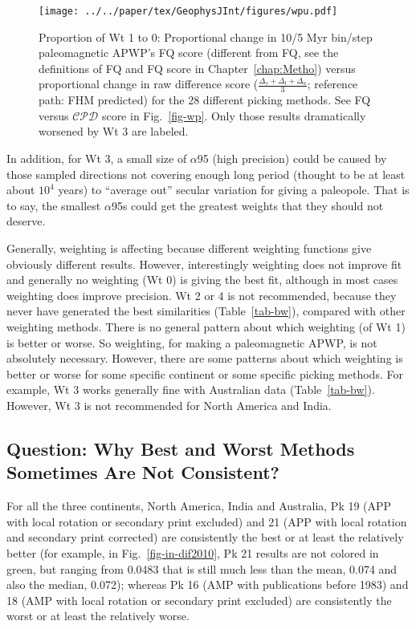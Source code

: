\begin{figure}
  \centering
  \texttt{[image: ../../paper/tex/GeophysJInt/figures/wpu.pdf]}
  \caption[Proportional changes of Wt 1 to 0: Paleomagnetic APWP's
    FQ score vs raw difference score]{Proportion of Wt 1 to 0:
    Proportional change in 10/5 Myr bin/step paleomagnetic APWP's FQ score
    (different from FQ, see the definitions of FQ and FQ score in
    Chapter~\ref{chap:Metho}) versus proportional change in raw difference score
    ($\frac{\Delta_s+\Delta_l+\Delta_a}{3}$; reference path: FHM predicted) for
    the 28 different picking methods. See FQ versus $\mathcal{CPD}$ score in
    Fig.~\ref{fig-wp}. Only those results dramatically worsened by Wt 3 are
    labeled.}\label{fig-wpu}
\end{figure}

In addition, for Wt 3, a small size of $\alpha$95 (high precision) could be
caused by those sampled directions not covering enough long period (thought to
be at least about $10^4$ years) to ``average out'' secular variation for giving
a paleopole. That is to say, the smallest $\alpha$95s could get the greatest
weights that they should not deserve.

Generally, weighting is affecting because different weighting functions give
obviously different results. However, interestingly weighting does not improve
fit and generally no weighting (Wt 0) is giving the best fit, although in most
cases weighting does improve precision. Wt 2 or 4 is not recommended, because
they never have generated the best similarities (Table~\ref{tab-bw}), compared
with other weighting methods. There is no general pattern about which weighting
(of Wt 1) is better or worse. So weighting, for making a
paleomagnetic APWP, is not absolutely necessary. However, there are some
patterns about which weighting is better or worse for some specific continent or
some specific picking methods. For example, Wt 3 works generally fine with
Australian data (Table~\ref{tab-bw}). However, Wt 3 is not recommended for North
America and India.

\subsection{Question: Why Best and Worst Methods Sometimes Are Not Consistent?}

For all the three continents, North America, India and Australia, Pk 19 (APP
with local rotation or secondary print excluded) and 21 (APP with local rotation
and secondary print corrected) are consistently the best or at least the
relatively better (for example, in Fig.~\ref{fig-in-dif2010}, Pk 21 results are
not colored in green, but ranging from 0.0483 that is still
much less than the mean, 0.074 and also the median, 0.072); whereas Pk 16 (AMP
with publications before 1983) and 18 (AMP with local rotation or secondary
print excluded) are consistently the worst or at least the relatively worse.

